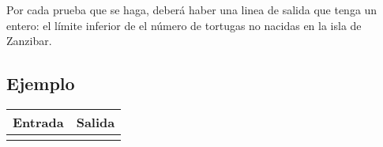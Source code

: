 Por cada prueba que se haga, deberá haber una linea de salida que tenga un entero: el límite inferior de el número de tortugas no nacidas en la isla de Zanzibar.

\subsection{Ejemplo}

\begin{tabu} to \linewidth {|X[c]|X[c]|}
  \hline
  \rowfont{\bfseries\itshape\large} Entrada & Salida \\
  \hline
   &  \\
  \hline  
\end{tabu}
